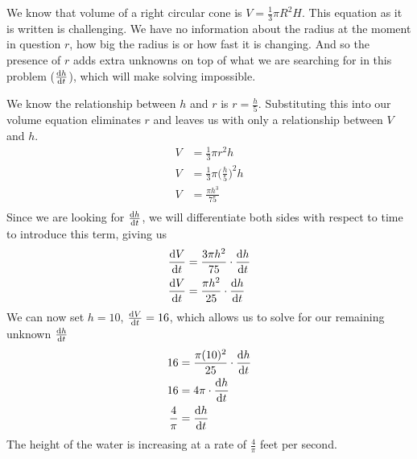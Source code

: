 \documentclass[main]{subfiles}
\begin{document}
\begin{enumerate}[resume]
\begin{enumerate}
\begin{solution}
        We know that volume of a right circular cone is $V=\frac{1}{3}\pi R^2 H$. This equation as it is written is challenging. We have no information about the radius at the moment in question $r$, how big the radius is or how fast it is changing. And so the presence of $r$ adds extra unknowns on top of what we are searching for in this problem ($\diff{h}{t}$), which will make solving impossible. 

        We know the relationship between $h$ and $r$ is $r=\frac{h}{5}$. Substituting this into our volume equation eliminates $r$ and leaves us with only a relationship between $V$ and $h$.
        \begin{align*}
            V&=\frac{1}{3}\pi r^2  h\\
            V&= \frac{1}{3} \pi \bigg(\frac{h}{5}\bigg)^2h\\
            V&= \frac{\pi h^3}{75}\\
            \end{align*}
            Since we are looking for $\diff{h}{t}$, 
            we will differentiate both sides with respect to time to introduce this term, giving us\\
            
            \begin{align*}
            \diff{V}{t}&=\frac{3\pi h^2}{75}\cdot\diff{h}{t}\\
            \diff{V}{t}&=\frac{\pi h^2}{25}\cdot\diff{h}{t}\\
            \end{align*}
            We can now set $h=10$, $\diff{V}{t}=16$, which allows us to solve for our remaining unknown $\diff{h}{t}$\\
            \begin{align*}
            16 &=\frac{\pi (10)^2}{25}\cdot\diff{h}{t}\\
            16&=4\pi\cdot \diff{h}{t}\\
            \frac{4}{\pi}&=\diff{h}{t} 
        \end{align*}
        The height of the water is increasing at a rate of $\frac{4}{\pi}$ feet per second.
    \end{solution}
\end{enumerate}

\end{enumerate}
\end{document}
